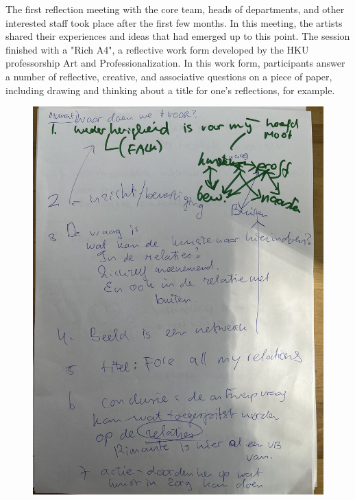 \documentclass[authordate, empirical]{jote-new-article}
\begin{document}
	{



	The first reflection meeting with the core team, heads of departments, and other interested staff took place after the first few months. In this meeting, the artists shared their experiences and ideas that had emerged up to this point. The session finished with a "Rich A4", a reflective work form developed by the HKU professorship Art and Professionalization. In this work form, participants answer a number of reflective, creative, and associative questions on a piece of paper, including drawing and thinking about a title for one's reflections, for example.







	\begin{figure}
		\includegraphics[angle=270, width=\linewidth]{media/fig1.jpeg}


\end{figure}}
\end{document}
